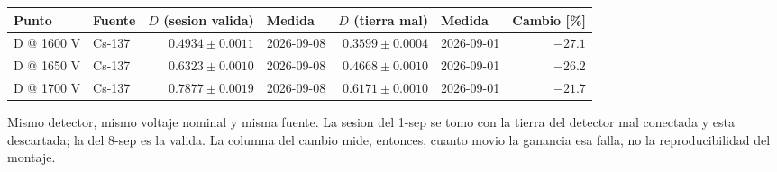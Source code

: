 \begin{tabular}{llrlrlr}
\toprule
\textbf{Punto} & \textbf{Fuente} & \textbf{$D$ (sesion valida)} & \textbf{Medida} & \textbf{$D$ (tierra mal)} & \textbf{Medida} & \textbf{Cambio [\%]} \\
\midrule
D @ 1600 V & Cs-137 & $0.4934 \pm 0.0011$ & 2026-09-08 & $0.3599 \pm 0.0004$ & 2026-09-01 & $-27.1$ \\
D @ 1650 V & Cs-137 & $0.6323 \pm 0.0010$ & 2026-09-08 & $0.4668 \pm 0.0010$ & 2026-09-01 & $-26.2$ \\
D @ 1700 V & Cs-137 & $0.7877 \pm 0.0019$ & 2026-09-08 & $0.6171 \pm 0.0010$ & 2026-09-01 & $-21.7$ \\
\bottomrule
\end{tabular}
\par\smallskip
\begin{minipage}{0.95\linewidth}\footnotesize Mismo detector, mismo voltaje nominal y misma fuente. La sesion del 1-sep se tomo con la tierra del detector mal conectada y esta descartada; la del 8-sep es la valida. La columna del cambio mide, entonces, cuanto movio la ganancia esa falla, no la reproducibilidad del montaje.\end{minipage}
